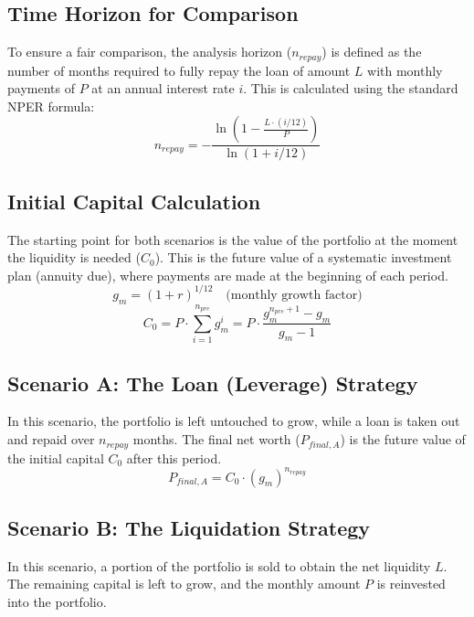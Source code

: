 \documentclass[a4paper, 11pt]{article}
\begin{document}
	\subsection{Time Horizon for Comparison}
	To ensure a fair comparison, the analysis horizon ($n_{repay}$) is defined as the number of months required to fully repay the loan of amount $L$ with monthly payments of $P$ at an annual interest rate $i$. This is calculated using the standard NPER formula:
	\begin{equation}
		n_{repay} = -\frac{\ln\left(1 - \frac{L \cdot (i/12)}{P}\right)}{\ln(1 + i/12)}
	\end{equation}
	
	\subsection{Initial Capital Calculation}
	The starting point for both scenarios is the value of the portfolio at the moment the liquidity is needed ($C_0$). This is the future value of a systematic investment plan (annuity due), where payments are made at the beginning of each period.
	\begin{equation}
		g_m = (1 + r)^{1/12} \quad \text{(monthly growth factor)}
	\end{equation}
	\begin{equation}
		C_0 = P \cdot \sum_{i=1}^{n_{pre}} g_m^i = P \cdot \frac{g_m^{n_{pre}+1} - g_m}{g_m - 1}
	\end{equation}
	
	\subsection{Scenario A: The Loan (Leverage) Strategy}
	In this scenario, the portfolio is left untouched to grow, while a loan is taken out and repaid over $n_{repay}$ months. The final net worth ($P_{final, A}$) is the future value of the initial capital $C_0$ after this period.
	\begin{equation}
		P_{final, A} = C_0 \cdot (g_m)^{n_{repay}}
	\end{equation}
	
	\subsection{Scenario B: The Liquidation Strategy}
	In this scenario, a portion of the portfolio is sold to obtain the net liquidity $L$. The remaining capital is left to grow, and the monthly amount $P$ is reinvested into the portfolio.
	
\end{document}
